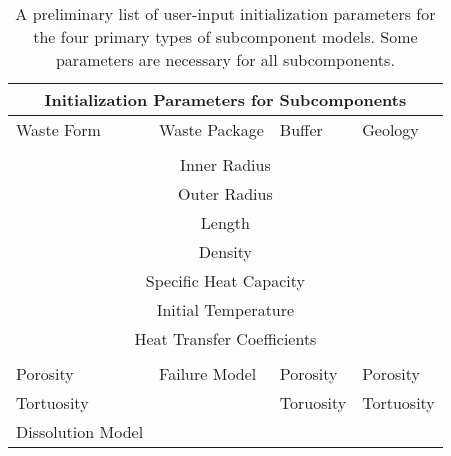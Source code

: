 %
\begin{table}
  \centering
  \footnotesize{
  \begin{tabular}{|l|l|l|l|}
    \multicolumn{4}{c}{\textbf{Initialization Parameters for Subcomponents}}\\
    \hline
    Waste Form & Waste Package & Buffer & Geology \\
    \hline
    \multicolumn{4}{|c|}{}\\
    \multicolumn{4}{|c|}{Inner Radius}\\
    \multicolumn{4}{|c|}{Outer Radius}\\
    \multicolumn{4}{|c|}{Length}\\
    \multicolumn{4}{|c|}{Density}\\
    \multicolumn{4}{|c|}{Specific Heat Capacity}\\
    \multicolumn{4}{|c|}{Initial Temperature}\\
    \multicolumn{4}{|c|}{Heat Transfer Coefficients}\\
    \multicolumn{4}{|c|}{}\\
    \hline
    Porosity           &  Failure Model & Porosity & Porosity \\
    Tortuosity         &                & Toruosity & Tortuosity \\
    Dissolution Model  &                &           &  \\
    \hline
  \end{tabular}
  \caption[Initialization Parameters for Subcomponents]{A preliminary list of 
  user-input initialization parameters for the four primary types of 
  subcomponent models. Some parameters are necessary for all subcomponents.}
  \label{tab:params}
  }
\end{table}


